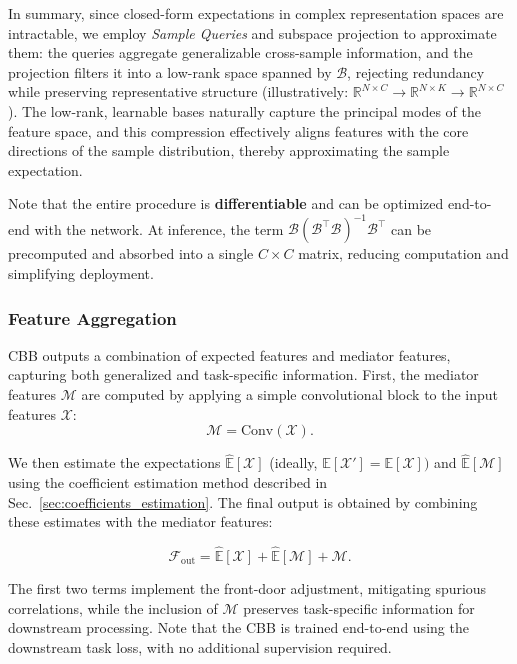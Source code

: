 In summary, since closed-form expectations in complex representation spaces are intractable, 
we employ \textit{Sample Queries} and subspace projection to approximate them: the queries aggregate generalizable cross-sample information, and the projection filters it into a low-rank space spanned by $\mathcal{B}$, rejecting redundancy while preserving representative structure (illustratively: $\mathbb{R}^{N \times C} \to \mathbb{R}^{N \times K} \to \mathbb{R}^{N \times C}$).
The low-rank, learnable bases naturally capture the principal modes of the feature space, and this compression effectively aligns features with the core directions of the sample distribution, thereby approximating the sample expectation.

Note that the entire procedure is \textbf{differentiable} and can be optimized end-to-end with the network.
At inference, the term $\mathcal{B} (\mathcal{B}^{\top} \mathcal{B})^{-1} \mathcal{B}^{\top}$ can be precomputed and absorbed into a single $C \times C$ matrix, reducing computation and simplifying deployment.


\subsubsection{Feature Aggregation}
CBB outputs a combination of expected features and mediator features, capturing both generalized and task-specific information.  
First, the mediator features $\mathcal{M}$ are computed by applying a simple convolutional block to the input features $\mathcal{X}$:  
\begin{equation}
   \mathcal{M} = \mathrm{Conv}(\mathcal{X}).
\end{equation}

We then estimate the expectations $\hat{\mathbb{E}}[\mathcal{X}]$ (ideally, $\mathbb{E}[\mathcal{X}'] = \mathbb{E}[\mathcal{X}])$ and $\hat{\mathbb{E}}[\mathcal{M}]$ 
using the coefficient estimation method described in Sec.~\ref{sec:coefficients_estimation}. 
The final output is obtained by combining these estimates with the mediator features:

\begin{equation}
   \mathcal{F}_{\text{out}} = \hat{\mathbb{E}}[\mathcal{X}] + \hat{\mathbb{E}}[\mathcal{M}] + \mathcal{M}.
\end{equation}

The first two terms implement the front-door adjustment, mitigating spurious correlations, while the inclusion of $\mathcal{M}$ preserves task-specific information for downstream processing. Note that the CBB is trained end-to-end using the downstream task loss, with no additional supervision required.





